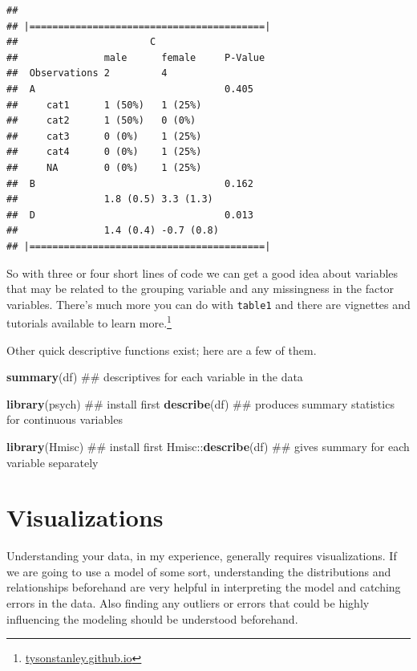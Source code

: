\documentclass[]{tufte-book}
\newenvironment{Shaded}{}{}
\newcommand{\KeywordTok}[1]{\textcolor[rgb]{0.00,0.44,0.13}{\textbf{#1}}}
\newcommand{\OperatorTok}[1]{\textcolor[rgb]{0.40,0.40,0.40}{#1}}
\newcommand{\NormalTok}[1]{#1}
\theoremstyle{definition}
\theoremstyle{definition}
\theoremstyle{remark}
\begin{document}
\begin{verbatim}
## 
## |=========================================|
##                       C 
##               male      female     P-Value
##  Observations 2         4                 
##  A                                 0.405  
##     cat1      1 (50%)   1 (25%)           
##     cat2      1 (50%)   0 (0%)            
##     cat3      0 (0%)    1 (25%)           
##     cat4      0 (0%)    1 (25%)           
##     NA        0 (0%)    1 (25%)           
##  B                                 0.162  
##               1.8 (0.5) 3.3 (1.3)         
##  D                                 0.013  
##               1.4 (0.4) -0.7 (0.8)        
## |=========================================|
\end{verbatim}

So with three or four short lines of code we can get a good idea about
variables that may be related to the grouping variable and any
missingness in the factor variables. There's much more you can do with
\texttt{table1} and there are vignettes and tutorials available to learn
more.\footnote{\url{tysonstanley.github.io}}

Other quick descriptive functions exist; here are a few of them.

\begin{Shaded}
\begin{Highlighting}[]
\KeywordTok{summary}\NormalTok{(df)  ## descriptives for each variable in the data}

\KeywordTok{library}\NormalTok{(psych)  ## install first}
\KeywordTok{describe}\NormalTok{(df)  ## produces summary statistics for continuous variables}

\KeywordTok{library}\NormalTok{(Hmisc)  ## install first}
\NormalTok{Hmisc}\OperatorTok{::}\KeywordTok{describe}\NormalTok{(df)  ## gives summary for each variable separately}
\end{Highlighting}
\end{Shaded}

\section*{Visualizations}\label{visualizations}

Understanding your data, in my experience, generally requires
visualizations. If we are going to use a model of some sort,
understanding the distributions and relationships beforehand are very
helpful in interpreting the model and catching errors in the data. Also
finding any outliers or errors that could be highly influencing the
modeling should be understood beforehand.
\end{document}
